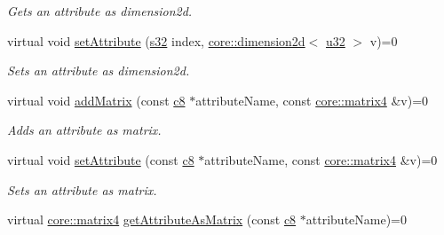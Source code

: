 \begin{DoxyCompactItemize}
\begin{DoxyCompactList}\small\item\em Gets an attribute as dimension2d. \end{DoxyCompactList}\item 
\mbox{\label{classirr_1_1io_1_1IAttributes_ad2019a4dbefb6b45b80fe702fe99d3ae}} 
virtual void \hyperlink{classirr_1_1io_1_1IAttributes_ad2019a4dbefb6b45b80fe702fe99d3ae}{set\+Attribute} (\hyperlink{namespaceirr_ac66849b7a6ed16e30ebede579f9b47c6}{s32} index, \hyperlink{classirr_1_1core_1_1dimension2d}{core\+::dimension2d}$<$ \hyperlink{namespaceirr_a0416a53257075833e7002efd0a18e804}{u32} $>$ v)=0
\begin{DoxyCompactList}\small\item\em Sets an attribute as dimension2d. \end{DoxyCompactList}\item 
\mbox{\label{classirr_1_1io_1_1IAttributes_a766631588618287f20af1f66f21fca3d}} 
virtual void \hyperlink{classirr_1_1io_1_1IAttributes_a766631588618287f20af1f66f21fca3d}{add\+Matrix} (const \hyperlink{namespaceirr_a9395eaea339bcb546b319e9c96bf7410}{c8} $\ast$attribute\+Name, const \hyperlink{namespaceirr_1_1core_a4c9d4e29899535971052810954a14431}{core\+::matrix4} \&v)=0
\begin{DoxyCompactList}\small\item\em Adds an attribute as matrix. \end{DoxyCompactList}\item 
\mbox{\label{classirr_1_1io_1_1IAttributes_ad722717549e321ad37e6a63a9dde6365}} 
virtual void \hyperlink{classirr_1_1io_1_1IAttributes_ad722717549e321ad37e6a63a9dde6365}{set\+Attribute} (const \hyperlink{namespaceirr_a9395eaea339bcb546b319e9c96bf7410}{c8} $\ast$attribute\+Name, const \hyperlink{namespaceirr_1_1core_a4c9d4e29899535971052810954a14431}{core\+::matrix4} \&v)=0
\begin{DoxyCompactList}\small\item\em Sets an attribute as matrix. \end{DoxyCompactList}\item 
virtual \hyperlink{namespaceirr_1_1core_a4c9d4e29899535971052810954a14431}{core\+::matrix4} \hyperlink{classirr_1_1io_1_1IAttributes_a0329ce7827096c56f3c7e905afe04ced}{get\+Attribute\+As\+Matrix} (const \hyperlink{namespaceirr_a9395eaea339bcb546b319e9c96bf7410}{c8} $\ast$attribute\+Name)=0

\end{DoxyCompactItemize}
